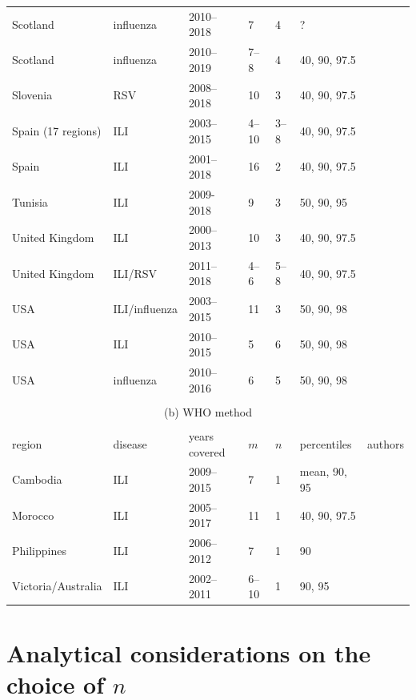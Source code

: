 \documentclass{article}
\begin{document}
\begin{table}[h!]
\begin{tabular}{l l l l l l l}
Scotland & influenza & 2010--2018 & 7 & 4 & ? & \cite{Murray2018}\\
Scotland & influenza & 2010--2019 & 7--8 & 4 & 40, 90, 97.5 & \cite{Dickson2020}\\
Slovenia & RSV & 2008--2018 & 10 & 3 & 40, 90, 97.5 & \cite{Grilc2021}\\
Spain (17 regions) & ILI & 2003--2015 & 4--10 & 3--8 & 40, 90, 97.5 & \cite{Bangert2017}\\
Spain & ILI & 2001--2018 & 16 & 2 & 40, 90, 97.5 & \cite{RedondoBravo2020}\\
Tunisia & ILI & 2009-2018 & 9 & 3 & 50, 90, 95 & \cite{Bouguerra2020}\\
United Kingdom & ILI & 2000--2013 & 10 & 3 & 40, 90, 97.5 & \cite{Green2015}\\
United Kingdom & ILI/RSV & 2011--2018 & 4--6 & 5--8 & 40, 90, 97.5 & \cite{Harcourt2019}\\
USA & ILI/influenza & 2003--2015 & 11 & 3 & 50, 90, 98 & \cite{Biggerstaff2017}\\
USA & ILI & 2010--2015 & 5 & 6 & 50, 90, 98 & \cite{Dahlgren2018}\\
USA & influenza & 2010--2016 & 6 & 5 & 50, 90, 98 & \cite{Dahlgren2019}\\
\bottomrule\\
\multicolumn{7}{c}{(b) WHO method}\\ \\
\toprule
region & disease & years covered & $m$ & $n$ & percentiles & authors\\
\midrule
Cambodia & ILI & 2009--2015 & 7 & 1 & mean, 90, 95 & \cite{Ly2017}\\
Morocco & ILI & 2005--2017 & 11 & 1 & 40, 90, 97.5 & \cite{Rguig2020}\\
Philippines & ILI & 2006--2012 & 7 & 1 & 90 & \cite{Lucero2016}\\
Victoria/Australia & ILI & 2002--2011 & 6--10 & 1 & 90, 95 & \cite{Tay2013}\\
\end{tabular}
\end{table}


\section{Analytical considerations on the choice of $n$}
\label{sec:analytical}
\end{document}
